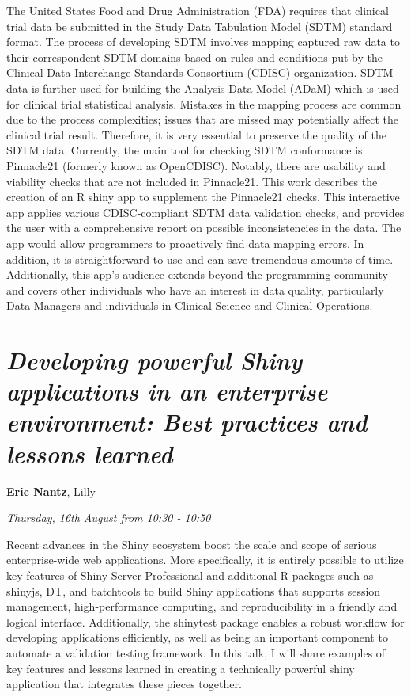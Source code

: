 \documentclass[]{book}
\theoremstyle{definition}
\theoremstyle{definition}
\theoremstyle{definition}
\theoremstyle{remark}
\begin{document}
The United States Food and Drug Administration (FDA) requires that
clinical trial data be submitted in the Study Data Tabulation Model
(SDTM) standard format. The process of developing SDTM involves mapping
captured raw data to their correspondent SDTM domains based on rules and
conditions put by the Clinical Data Interchange Standards Consortium
(CDISC) organization. SDTM data is further used for building the
Analysis Data Model (ADaM) which is used for clinical trial statistical
analysis. Mistakes in the mapping process are common due to the process
complexities; issues that are missed may potentially affect the clinical
trial result. Therefore, it is very essential to preserve the quality of
the SDTM data. Currently, the main tool for checking SDTM conformance is
Pinnacle21 (formerly known as OpenCDISC). Notably, there are usability
and viability checks that are not included in Pinnacle21. This work
describes the creation of an R shiny app to supplement the Pinnacle21
checks. This interactive app applies various CDISC-compliant SDTM data
validation checks, and provides the user with a comprehensive report on
possible inconsistencies in the data. The app would allow programmers to
proactively find data mapping errors. In addition, it is straightforward
to use and can save tremendous amounts of time. Additionally, this app's
audience extends beyond the programming community and covers other
individuals who have an interest in data quality, particularly Data
Managers and individuals in Clinical Science and Clinical Operations.

\hypertarget{developing-powerful-shiny-applications-in-an-enterprise-environment-best-practices-and-lessons-learned}{%
\section{\texorpdfstring{\emph{Developing powerful Shiny applications in
an enterprise environment: Best practices and lessons
learned}}{Developing powerful Shiny applications in an enterprise environment: Best practices and lessons learned}}\label{developing-powerful-shiny-applications-in-an-enterprise-environment-best-practices-and-lessons-learned}}

\textbf{Eric Nantz}, Lilly

\emph{Thursday, 16th August from 10:30 - 10:50}

Recent advances in the Shiny ecosystem boost the scale and scope of
serious enterprise-wide web applications. More specifically, it is
entirely possible to utilize key features of Shiny Server Professional
and additional R packages such as shinyjs, DT, and batchtools to build
Shiny applications that supports session management, high-performance
computing, and reproducibility in a friendly and logical interface.
Additionally, the shinytest package enables a robust workflow for
developing applications efficiently, as well as being an important
component to automate a validation testing framework. In this talk, I
will share examples of key features and lessons learned in creating a
technically powerful shiny application that integrates these pieces
together.
\end{document}
